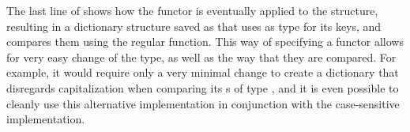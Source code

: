 \documentclass[10pt,a4paper,master=cws, masteroption=ai,english,inputenc=utf8]{kulemt}
\begin{document}
The last line of  shows how the functor  is eventually applied to the  structure, resulting in a dictionary structure saved as  that uses  as type for its keys, and compares them using the regular  function.
This way of specifying a functor allows for very easy change of the  type, as well as the way that they are compared.
For example, it would require only a very minimal change to create a dictionary that disregards capitalization when comparing its s of type , and it is even possible to cleanly use this alternative implementation in conjunction with the case-sensitive implementation.

\smallskip



\end{document}
